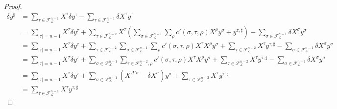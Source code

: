 \documentclass[a4paper,11pt,reqno]{article}
\newcommand{\1}{{\bf 1}}
\newcommand{\der}{\delta}
\newcommand{\FF}{\mathcal{F}}
\newcommand{\cl}{\mathcal L}
\begin{document}
\begin{proof}
  \begin{equation*}
  \begin{split}
\der y^\sharp & =  \sum_{\tau\in \FF_\cl^{n-1}}  X^\tau \der y^\tau - \sum_{\tau \in \FF_\cl^{n-1}}  \der X^\tau  y^\tau    
\\ & = \sum_{|\tau| = n-1}  X^\tau \der y^\tau+  \sum_{\tau\in \FF_\cl^{n-2}}  X^\tau \left(\sum_{\sigma\in \FF_\cl^{n-1}} \sum_\rho c'(\sigma,\tau,\rho)  X^{\rho} y^{\sigma} + y^{\tau,\sharp}\right) - \sum_{\sigma\in \FF_\cl^{n-1}}  \der X^\sigma  y^\sigma    
\\ & =  \sum_{|\tau| = n-1}  X^\tau \der y^\tau+ \sum_{\tau\in \FF_\cl^{n-2}}   \sum_{\sigma\in \FF_\cl^{n-1}} \sum_\rho c'(\sigma,\tau,\rho)  X^\tau X^{\rho} y^{\sigma} +  \sum_{\tau\in \FF_\cl^{n-2}}  X^\tau  y^{\tau,\sharp}  - \sum_{\sigma\in \FF_\cl^{n-1}}  \der X^\sigma  y^\sigma
\\ & =  \sum_{|\tau| = n-1}  X^\tau \der y^\tau+\sum_{\sigma\in \FF_\cl^{n-1}} \sum_{\tau \in \FF_\cl^{n-2},\rho} c'(\sigma,\tau,\rho)  X^\tau X^{\rho} y^{\sigma} +  \sum_{\tau\in \FF_\cl^{n-2}}  X^\tau  y^{\tau,\sharp}  - \sum_{\sigma\in \FF_\cl^{n-1}}  \der X^\sigma  y^\sigma
\\ & =\sum_{|\tau| = n-1}  X^\tau \der y^\tau+ \sum_{\sigma \in \FF_\cl^{n-1}} (X^{\Delta' \sigma} - \der X^\sigma) y^{\sigma} +  \sum_{\tau\in \FF_\cl^{n-2}}  X^\tau  y^{\tau,\sharp}  
\\ & = \sum_{\tau\in \FF_\cl^{n-1}}  X^\tau  y^{\tau,\sharp} 
  \end{split}
\end{equation*}
\end{proof}
\end{document}
